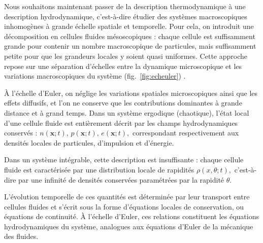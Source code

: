 




Nous souhaitons maintenant passer de la description thermodynamique à une
description hydrodynamique, c’est-à-dire étudier des systèmes macroscopiques
inhomogènes à grande échelle spatiale et temporelle. Pour cela, on introduit
une décomposition en cellules fluides mésoscopiques : chaque cellule est
suffisamment grande pour contenir un nombre macroscopique de particules, mais
suffisamment petite pour que les grandeurs locales y soient quasi uniformes.
Cette approche repose sur une séparation d’échelles entre la dynamique
microscopique et les variations macroscopiques du système
(fig.~\ref{fig:echeuler}) .

\smallskip

À l’échelle d’Euler, on néglige les variations spatiales microscopiques ainsi
que les effets diffusifs, et l’on ne conserve que les contributions dominantes
à grande distance et à grand temps. Dans un système ergodique (chaotique),
l’état local d’une cellule fluide est entièrement décrit par les champs
hydrodynamiques conservés :
\(
n(\mathbf{x};t),\,
p(\mathbf{x};t),\,
e(\mathbf{x};t),
\)
correspondant respectivement aux densités locales de particules, d’impulsion et
d’énergie.

\smallskip

Dans un système intégrable, cette description est insuffisante : chaque cellule
fluide est caractérisée par une distribution locale de rapidités \(
\rho(x,\theta;t), \) c’est-à-dire par une infinité de densités conservées
paramétrées par la rapidité $\theta$.

\smallskip

L’évolution temporelle de ces quantités est déterminée par leur transport entre
cellules fluides et s’écrit sous la forme d’équations locales de conservation,
ou équations de continuité. À l’échelle d’Euler, ces relations constituent les
équations hydrodynamiques du système, analogues aux équations d’Euler de la
mécanique des fluides.

\smallskip

